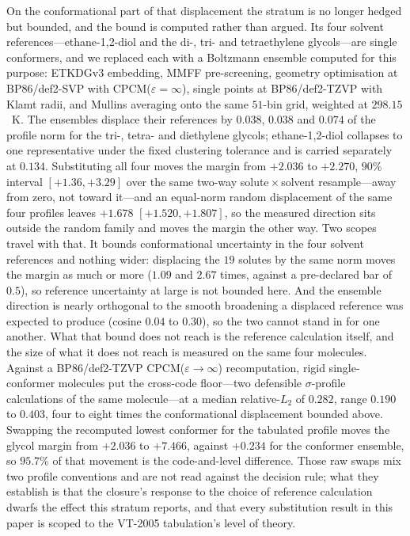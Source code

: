 On the conformational part of that displacement the stratum is no longer hedged but bounded, and
the bound is computed rather than argued. Its four solvent references---ethane-1,2-diol and the di-,
tri- and tetraethylene glycols---are single conformers, and we replaced each with a Boltzmann
ensemble computed for this purpose: ETKDGv3 embedding, MMFF pre-screening, geometry optimisation at
BP86/def2-SVP with CPCM($\varepsilon{=}\infty$), single points at BP86/def2-TZVP with Klamt radii,
and Mullins averaging onto the same $51$-bin grid, weighted at $298.15$~K. The ensembles displace
their references by $0.038$, $0.038$ and $0.074$ of the profile norm for the tri-, tetra- and
diethylene glycols; ethane-1,2-diol collapses to one representative under the fixed clustering
tolerance and is carried separately at $0.134$. Substituting all four moves the margin from
$+2.036$ to $+2.270$, $90\%$ interval $[+1.36,+3.29]$ over the same two-way solute\,$\times$\,solvent
resample---away from zero, not toward it---and an equal-norm random displacement of the same four
profiles leaves $+1.678$ $[+1.520,+1.807]$, so the measured direction sits outside the random
family and moves the margin the other way. Two scopes travel with that. It bounds conformational
uncertainty in the four solvent references and nothing wider: displacing the $19$ solutes by the
same norm moves the margin as much or more ($1.09$ and $2.67$ times, against a pre-declared bar of
$0.5$), so reference uncertainty at large is not bounded here. And the ensemble direction is nearly
orthogonal to the smooth broadening a displaced reference was expected to produce (cosine $0.04$ to
$0.30$), so the two cannot stand in for one another.
What that bound does not reach is the reference calculation itself, and the size of what it does not
reach is measured on the same four molecules. Against a BP86/def2-TZVP CPCM($\varepsilon{\to}\infty$)
recomputation, rigid single-conformer molecules put the cross-code floor---two defensible
$\sigma$-profile calculations of the same molecule---at a median relative-$L_2$ of $0.282$, range
$0.190$ to $0.403$, four to eight times the conformational displacement bounded above. Swapping the
recomputed lowest conformer for the tabulated profile moves the glycol margin from $+2.036$ to
$+7.466$, against $+0.234$ for the conformer ensemble, so $95.7\%$ of that movement is the
code-and-level difference. Those raw swaps mix two profile conventions and are not read against the
decision rule; what they establish is that the closure's response to the choice of reference
calculation dwarfs the effect this stratum reports, and that every substitution result in this paper
is scoped to the VT-2005 tabulation's level of theory.

